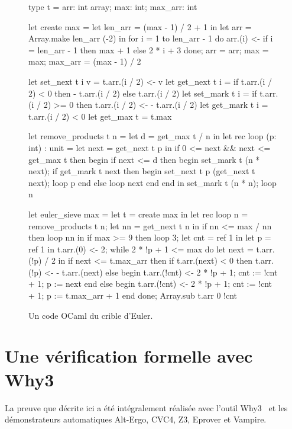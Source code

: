 \documentclass[a4paper]{easychair}
\begin{document}
\begin{figure}[tp]
\begin{ocaml}
type t = { arr: int array; max: int; max_arr: int }

let create max =
  let len_arr = (max - 1) / 2 + 1 in
  let arr = Array.make len_arr (-2) in
  for i = 1 to len_arr - 1 do
    arr.(i) <- if i = len_arr - 1 then max + 1 else 2 * i + 3
  done;
  { arr = arr; max = max; max_arr = (max - 1) / 2 }

let set_next t i v = t.arr.(i / 2) <- v
let get_next t i = if t.arr.(i / 2) < 0 then - t.arr.(i / 2) else t.arr.(i / 2)
let set_mark t i = if t.arr.(i / 2) >= 0 then t.arr.(i / 2) <- - t.arr.(i / 2)
let get_mark t i = t.arr.(i / 2) < 0
let get_max t = t.max

let remove_products t n =
  let d = get_max t / n in
  let rec loop (p: int) : unit =
    let next = get_next t p in
    if 0 <= next && next <= get_max t then begin
      if next <= d then begin
        set_mark t (n * next);
        if get_mark t next then begin set_next t p (get_next t next); loop p end
        else loop next
      end end in
  set_mark t (n * n); loop n

let euler_sieve max =
  let t = create max in
  let rec loop n =
    remove_products t n;
    let nn = get_next t n in
    if nn <= max / nn then loop nn in
  if max >= 9 then loop 3;
  let cnt = ref 1 in
  let p = ref 1 in t.arr.(0) <- 2;
  while 2 * !p + 1 <= max do
    let next = t.arr.(!p) / 2 in
    if next <= t.max_arr then
      if t.arr.(next) < 0 then t.arr.(!p) <- - t.arr.(next)
      else begin t.arr.(!cnt) <- 2 * !p + 1; cnt := !cnt + 1; p := next end
    else begin t.arr.(!cnt) <- 2 * !p + 1; cnt := !cnt + 1; p := t.max_arr + 1 end
  done;
  Array.sub t.arr 0 !cnt
\end{ocaml}
\caption{Un code OCaml du crible d'Euler.}
\label{fig:codeOCaml}
\end{figure}

\section{Une vérification formelle avec Why3}



La preuve que décrite ici a été intégralement réalisée avec l'outil
Why3~\cite{why3} et les démonstrateurs automatiques Alt-Ergo, CVC4, Z3, Eprover
et Vampire. %
\end{document}
